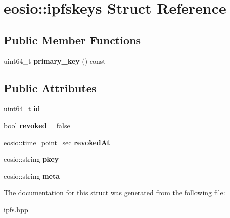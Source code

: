 \hypertarget{structeosio_1_1ipfskeys}{}\section{eosio\+:\+:ipfskeys Struct Reference}
\label{structeosio_1_1ipfskeys}
\subsection*{Public Member Functions}
\begin{DoxyCompactItemize}
\item 
\mbox{\label{structeosio_1_1ipfskeys_afb078a531cc80c90e8047ccac9eb18c7}} 
uint64\+\_\+t {\bfseries primary\+\_\+key} () const
\end{DoxyCompactItemize}
\subsection*{Public Attributes}
\begin{DoxyCompactItemize}
\item 
\mbox{\label{structeosio_1_1ipfskeys_a0d13db9739f571fd1758ffbdbc19d16b}} 
uint64\+\_\+t {\bfseries id}
\item 
\mbox{\label{structeosio_1_1ipfskeys_ad49e6362919fb565e16e0224c292de46}} 
bool {\bfseries revoked} = false
\item 
\mbox{\label{structeosio_1_1ipfskeys_a4d732f9206e810881b63b5d43e8144c3}} 
eosio\+::time\+\_\+point\+\_\+sec {\bfseries revoked\+At}
\item 
\mbox{\label{structeosio_1_1ipfskeys_a866a2ea6908cabbc1df5c526eaad612d}} 
eosio\+::string {\bfseries pkey}
\item 
\mbox{\label{structeosio_1_1ipfskeys_a47a4141aac294dd9799dc8a1d5a55e5e}} 
eosio\+::string {\bfseries meta}
\end{DoxyCompactItemize}


The documentation for this struct was generated from the following file\+:\begin{DoxyCompactItemize}
\item 
ipfs.\+hpp\end{DoxyCompactItemize}
